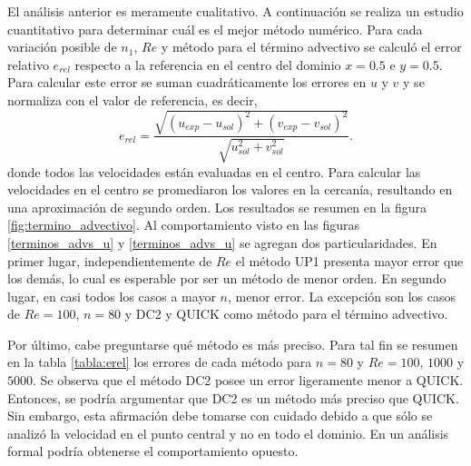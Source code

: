 \documentclass[aps,prb,twocolumn,superscriptaddress,floatfix,longbibliography,10pt]{revtex4-2}
\newif\ifptitle
\newif\ifpnumber
\newcounter{para}
\newcommand\ptitle[1]{\par\refstepcounter{para}
{\ifpnumber{\noindent\textcolor{lightgray}{\textbf{\thepara}}\indent}\fi}
{\ifptitle{\textbf{[{#1}]}}\fi}}
\begin{document}
\ptitle{Comparación numérica entre métodos numéricos para distintos $Re$.}
El análisis anterior es meramente cualitativo. A continuación se realiza un estudio cuantitativo para determinar cuál es el mejor método numérico. Para cada variación posible de $n_1$, $Re$ y método para el término advectivo se calculó el error relativo $e_{rel}$ respecto a la referencia  en el centro del dominio $x = 0.5$ e $y = 0.5$. Para calcular este error se suman cuadráticamente los errores en $u$ y $v$ y se normaliza con el valor de referencia, es decir,
\[e_{rel} = \frac{\sqrt{(u_{exp} - u_{sol})^2 + (v_{exp} - v_{sol})^2}}{\sqrt{u_{sol}^2 + v_{sol}^2}}. \]
donde todos las velocidades están evaluadas en el centro. Para calcular las velocidades en el centro se promediaron los valores en la cercanía, resultando en una aproximación de segundo orden. Los resultados se resumen en la figura \ref{fig:termino_advectivo}. Al comportamiento visto en las figuras \ref{terminos_advs_u} y \ref{terminos_advs_u} se agregan dos particularidades. En primer lugar, independientemente de $Re$ el método UP1 presenta mayor error que los demás, lo cual es esperable por ser un método de menor orden. En segundo lugar, en casi todos los casos a mayor $n$, menor error. La excepción son los casos de $Re = 100$, $n = 80$ y DC2 y QUICK como método para el término advectivo.

Por último, cabe preguntarse qué método es más preciso. Para tal fin se resumen en la tabla \ref{tabla:erel} los errores de cada método para $n = 80$ y $Re = 100$, $1000$ y $5000$. Se observa que el método DC2 posee un error ligeramente menor a QUICK. Entonces, se podría argumentar que DC2 es un método más preciso que QUICK. Sin embargo, esta afirmación debe tomarse con cuidado debido a que sólo se analizó la velocidad en el punto central y no en todo el dominio. En un análisis formal podría obtenerse el comportamiento opuesto.





\end{document}
